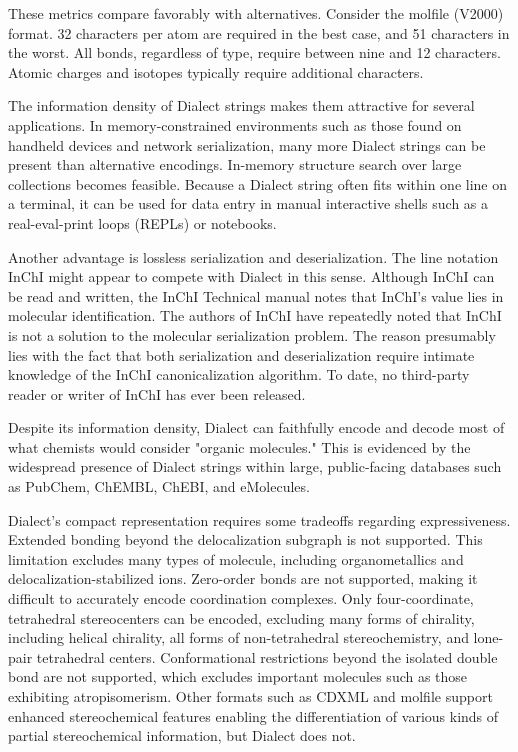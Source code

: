 \documentclass{article}
\begin{document}
These metrics compare favorably with alternatives. Consider the molfile (V2000) format. 32 characters per atom are required in the best case, and 51 characters in the worst. All bonds, regardless of type, require between nine and 12 characters. Atomic charges and isotopes typically require additional characters.

The information density of Dialect strings makes them attractive for several applications. In memory-constrained environments such as those found on handheld devices and network serialization, many more Dialect strings can be present than alternative encodings. In-memory structure search over large collections becomes feasible. Because a Dialect string often fits within one line on a terminal, it can be used for data entry in manual interactive shells such as a real-eval-print loops (REPLs) or notebooks.

Another advantage is lossless serialization and deserialization. The line notation InChI might appear to compete with Dialect in this sense. Although InChI can be read and written, the InChI Technical manual notes that InChI's value lies in molecular identification. The authors of InChI have repeatedly noted that InChI is not a solution to the molecular serialization problem. The reason presumably lies with the fact that both serialization and deserialization require intimate knowledge of the InChI canonicalization algorithm. To date, no third-party reader or writer of InChI has ever been released.

Despite its information density, Dialect can faithfully encode and decode most of what chemists would consider "organic molecules." This is evidenced by the widespread presence of Dialect strings within large, public-facing databases such as PubChem, ChEMBL, ChEBI, and eMolecules.

Dialect's compact representation requires some tradeoffs regarding expressiveness. Extended bonding beyond the delocalization subgraph is not supported. This limitation excludes many types of molecule, including organometallics and delocalization-\-stabilized ions. Zero-\-order bonds are not supported, making it difficult to accurately encode coordination complexes. Only four-\-coordinate, tetrahedral stereocenters can be encoded, excluding many forms of chirality, including helical chirality, all forms of non-\-tetrahedral stereochemistry, and lone-\-pair tetrahedral centers. Conformational restrictions beyond the isolated double bond are not supported, which excludes important molecules such as those exhibiting atropisomerism. Other formats such as CDXML and molfile support enhanced stereochemical features enabling the differentiation of various kinds of partial stereochemical information, but Dialect does not.
\end{document}
